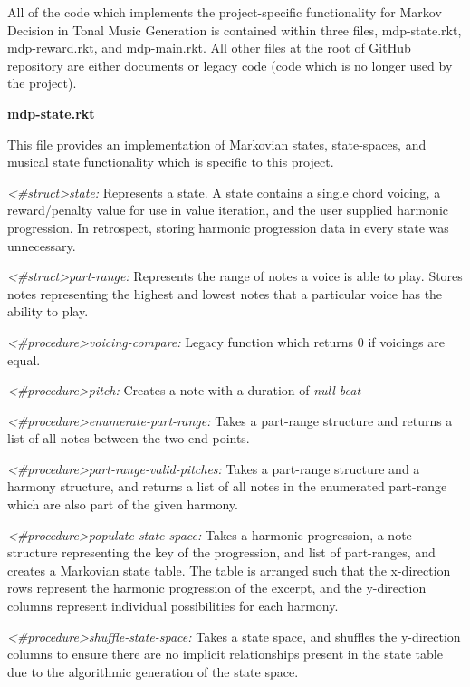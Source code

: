 \documentclass{chi2009}
\begin{document}
All of the code which implements the project-specific functionality for Markov Decision in Tonal Music Generation is contained within three files, mdp-state.rkt, mdp-reward.rkt, and mdp-main.rkt.  All other files at the root of  GitHub repository are either documents or legacy code (code which is no longer used by the project).


\textbf{mdp-state.rkt}

This file provides an implementation of Markovian states, state-spaces, and musical state functionality which is specific to this project.

\textit{\textless\#struct\textgreater state: }
Represents a state.  A state contains a single chord voicing, a reward/penalty value for use in value iteration, and the user supplied harmonic progression.  In retrospect, storing harmonic progression data in every state was unnecessary.

\textit{\textless\#struct\textgreater part-range: }
Represents the range of notes a voice is able to play.  Stores notes representing the highest and lowest notes that a particular voice has the ability to play.

\textit{\textless\#procedure\textgreater voicing-compare: }
Legacy function which returns 0 if voicings are equal.  


\textit{\textless\#procedure\textgreater pitch: }
Creates a note with a duration of \textit{null-beat}

\textit{\textless\#procedure\textgreater enumerate-part-range: }
Takes a part-range structure and returns a list of all notes between the two end points.

\textit{\textless\#procedure\textgreater part-range-valid-pitches:}
Takes a part-range structure and a harmony structure, and returns a list of all notes in the enumerated part-range which are also part of the given harmony.

\textit{\textless\#procedure\textgreater populate-state-space:}
Takes a harmonic progression, a note structure representing the key of the progression, and list of part-ranges, and creates a Markovian state table.  The table is arranged such that the x-direction rows represent the harmonic progression of the excerpt, and the y-direction columns represent individual possibilities for each harmony.

\textit{\textless\#procedure\textgreater shuffle-state-space:}
Takes a state space, and shuffles the y-direction columns to ensure there are no implicit relationships present in the state table due to the algorithmic generation of the state space.
\end{document}

